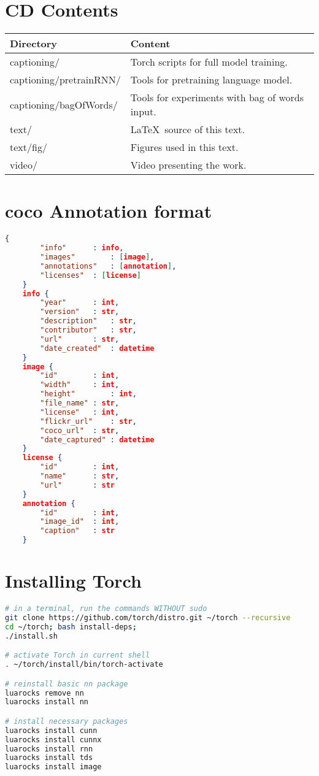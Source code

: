 \chapter{CD Contents}

\begin{table}[h]
	\centering
	\renewcommand{\arraystretch}{1.2}
	\begin{tabular}{|l|l|}
		\hline
		Directory & Content  \\
		\hline
		\hline
		captioning/ & Torch scripts for full model training. \\
		captioning/pretrainRNN/ & Tools for pretraining language model. \\
		captioning/bagOfWords/ & Tools for experiments with bag of words input. \\
		text/ & \LaTeX\ source of this text. \\
		text/fig/ & Figures used in this text. \\
		video/ & Video presenting the work. \\
		\hline
	\end{tabular}
	\label{tab:cdcontent}
\end{table}

\chapter{\gls{coco} Annotation format} \label{chp:jsonAnnotation}
\begin{lstlisting}[language=json,firstnumber=1]
	{
		"info"		: info,
		"images"		: [image],
		"annotations"	: [annotation],
		"licenses"	: [license]
	}
	info {
		"year"		: int,
		"version"	: str,
		"description"	: str,
		"contributor"	: str,
		"url"		: str,
		"date_created"	: datetime
	}
	image {
		"id"		: int,
		"width"		: int,
		"height"		: int,
		"file_name"	: str,
		"license"	: int,
		"flickr_url"	: str,
		"coco_url"	: str,
		"date_captured"	: datetime
	}
	license {
		"id"		: int,
		"name"		: str,
		"url"		: str
	}
	annotation {
		"id"		: int,
		"image_id"	: int,
		"caption"	: str
	}
\end{lstlisting}

\chapter{Installing Torch}\label{chp:installation}

\begin{lstlisting}[firstnumber=1,breakindent=75pt, language=bash,frame=single]
# in a terminal, run the commands WITHOUT sudo
git clone https://github.com/torch/distro.git ~/torch --recursive
cd ~/torch; bash install-deps;
./install.sh

# activate Torch in current shell
. ~/torch/install/bin/torch-activate

# reinstall basic nn package
luarocks remove nn
luarocks install nn

# install necessary packages
luarocks install cunn
luarocks install cunnx
luarocks install rnn
luarocks install tds
luarocks install image

\end{lstlisting}

